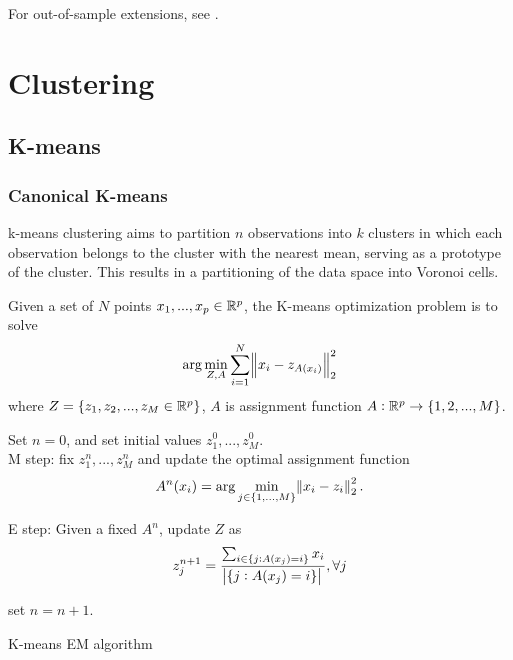 \begin{refsection}
\begin{remark}
For out-of-sample extensions, see \cite{bengio2004out}\cite{laing2007coarse}.
\end{remark}



\section{Clustering}

\subsection{K-means}
\subsubsection{Canonical K-means}

\begin{remark}[motivation]
k-means clustering aims to partition $n$ observations into $k$ clusters in which each observation belongs to the cluster with the nearest mean, serving as a prototype of the cluster. This results in a partitioning of the data space into Voronoi cells.	
\end{remark}


\begin{definition}\cite{Kanungo2002efficient}
Given a set of $N$ points $x_1,...,x_p \in \mathbb{R}^p$, the K-means optimization problem is to solve  
$$\arg\min_{Z,A} \sum_{i=1}^N \norm{x_i - z_{A(x_i)}}^2_2$$
where $Z = \{z_1,z_2,...,z_M \in \mathbb{R}^p\}$, $A$ is assignment function $A:\mathbb{R}^p\to \{1,2,...,M\}$.
\end{definition}


\begin{algorithm}[H]
	\SetAlgoLined
	Set $n=0$, and set initial values $z_1^0,...,z_M^0$.\\
	
	M step: fix $z_1^n,...,z_M^n$ and update the optimal assignment function $$A^n(x_i) = \arg\min_{j\in \{1,...,M\}}\norm{x_i - z_i}_2^2.$$
	
	E step: Given a fixed $A^n$, update $Z$ as
	$$z_j^{n+1} = \frac{\sum_{i\in \{j:A(x_j)=i\}} x_i}{\abs{\{j:A(x_j)=i\}}},\forall j$$
	
	set $n = n+1$.
	
	\caption{K-means EM algorithm}
\end{algorithm}



\end{refsection}
